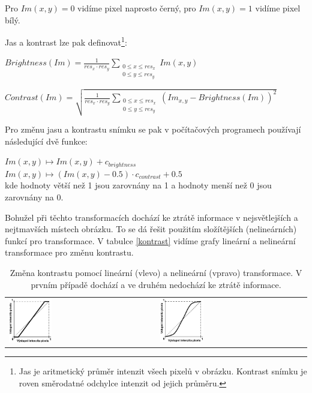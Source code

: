 Pro $ Im(x,y) = 0 $ vidíme pixel naprosto černý, pro $ Im(x,y) = 1 $ vidíme pixel bílý.

Jas a kontrast lze pak definovat\footnote{Jas je aritmetický průměr intenzit všech pixelů v obrázku. Kontrast snímku je roven směrodatné odchylce intenzit od jejich průměru.}\cite{wikipediaContrast}:


$Brightness(Im) = \frac{1}{res_{x} \cdot res_{y}}\sum_{\substack{0 \leq x \leq res_{x} \\ 0 \leq y \leq res_{y}}} Im(x,y)$

$Contrast(Im) = \sqrt{\frac{1}{res_{x} \cdot res_{y}}\sum_{\substack{ 0 \leq x \leq res_{x} \\ 0 \leq y \leq res_{y} }}(Im_{x,y}-Brightness(Im))^2}$

Pro změnu jasu a kontrastu snímku se pak v počítačových programech používají následující dvě funkce:

$ Im(x,y) \longmapsto Im(x,y) + c_{brightness} $ \\
\indent$ Im(x,y) \longmapsto   (Im(x,y) - 0.5) \cdot c_{contrast} + 0.5 $ \\
\indent kde hodnoty větší než 1 jsou zarovnány na 1 a hodnoty menší než 0 jsou zarovnány na 0.

Bohužel při těchto transformacích dochází ke ztrátě informace v nejsvětlejších a nejtmavších místech obrázku. To se dá řešit použitím složítějších (nelineárních) funkcí pro transformace. V tabulce \ref{kontrast} vidíme grafy lineární a nelineární transformace pro změnu kontrastu.

\noindent
\begin{table}[ht]
	\centering
		\begin{tabular}{p{}p{}}
			\includegraphics[width=0.3\textwidth,height=0.3\textwidth]{Text/IMG/Kontrast_Transformace_1.jpg}
		&
			\includegraphics[width=0.3\textwidth,height=0.3\textwidth]{Text/IMG/Kontrast_Transformace_2.jpg}
		\end{tabular}
	\caption{Změna kontrastu pomocí lineární (vlevo) a nelineární (vpravo) transformace. V prvním případě dochází a ve druhém nedochází ke ztrátě informace.}
\end{table}



